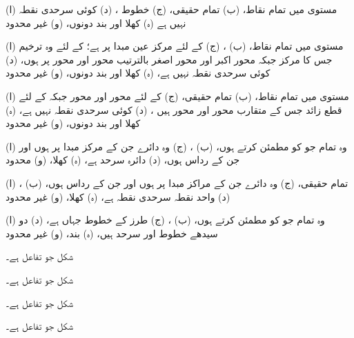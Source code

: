 \begin {description}\setlength {\parskip }{0pt} \setlength {\itemsep }{0pt plus 1pt}
\item [
\protect ١٣.\protect ١)
]
 (ا) مستوی  میں تمام نقاط، (ب) تمام حقیقی، (ج) خطوط ، (د) کوئی سرحدی نقطہ نہیں ہے (ہ) کھلا اور بند دونوں، (و) غیر محدود 
\item [
\protect ١٣.\protect ٣)
]
 (ا) مستوی  میں تمام نقاط، (ب) ، (ج)  کے لئے مرکز عین مبدا پر ہے؛  کے لئے وہ ترخیم جس کا مرکز  جبکہ محور اکبر اور محور اصغر بالترتیب محور  اور محور  پر ہوں، (د) کوئی سرحدی نقطہ نہیں ہے، (ہ) کھلا اور بند دونوں، (و) غیر محدود 
\item [
\protect ١٣.\protect ٥)
]
 (ا) مستوی  میں تمام نقاط، (ب) تمام حقیقی، (ج)  کے لئے محور  اور محور  جبکہ  کے لئے قطع زائد جس کے متقارب محور  اور محور  ہیں ، (د) کوئی سرحدی نقطہ نہیں ہے، (ہ) کھلا اور بند دونوں، (و) غیر محدود 
\item [
\protect ١٣.\protect ٧)
]
 (ا) وہ تمام  جو  کو مطمئن کرتے ہوں، (ب) ، (ج) وہ دائرے جن کے مرکز مبدا پر ہوں اور جن کے رداس  ہوں، (د) دائرہ  سرحد ہے، (ہ) کھلا، (و) محدود 
\item [
\protect ١٣.\protect ٩)
]
 (ا) ، (ب) تمام حقیقی، (ج) وہ دائرے جن کے مراکز مبدا پر ہوں اور جن کے رداس  ہوں، (د) واحد نقطہ  سرحدی نقطہ ہے، (ہ) کھلا، (و) غیر محدود 
\item [
\protect ١٣.\protect ١١)
]
 (ا) وہ تمام  جو  کو مطمئن کرتے ہوں، (ب) ، (ج)  طرز کے خطوط جہاں  ہے، (د) دو سیدھے خطوط  اور  سرحد ہیں، (ہ) بند، (و) غیر محدود 
\item [
\protect ١٣.\protect ١٣)
]
 شکل  جو تفاعل  ہے۔ 
\item [
\protect ١٣.\protect ١٤)
]
 شکل  جو تفاعل  ہے۔ 
\item [
\protect ١٣.\protect ١٥)
]
 شکل  جو تفاعل  ہے۔ 
\item [
\protect ١٣.\protect ١٦)
]
 شکل  جو تفاعل  ہے۔ 

\end{description}
